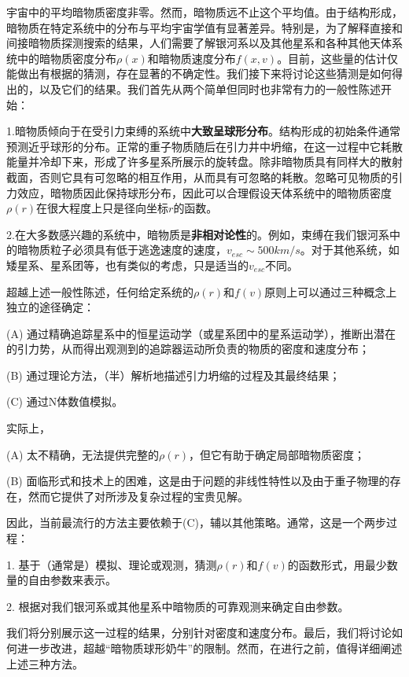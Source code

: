 


宇宙中的平均暗物质密度非零。然而，暗物质远不止这个平均值。由于结构形成，暗物质在特定系统中的分布与平均宇宙学值有显著差异。特别是，为了解释直接和间接暗物质探测搜索的结果，人们需要了解银河系以及其他星系和各种其他天体系统中的暗物质密度分布$\rho (x)$和暗物质速度分布$f(x, v)$。目前，这些量的估计仅能做出有根据的猜测，存在显著的不确定性。我们接下来将讨论这些猜测是如何得出的，以及它们的结果。我们首先从两个简单但同时也非常有力的一般性陈述开始：

1.暗物质倾向于在受引力束缚的系统中\textbf{大致呈球形分布}。结构形成的初始条件通常预测近乎球形的分布。正常的重子物质随后在引力井中坍缩，在这一过程中它耗散能量并冷却下来，形成了许多星系所展示的旋转盘。除非暗物质具有同样大的散射截面，否则它具有可忽略的相互作用，从而具有可忽略的耗散。忽略可见物质的引力效应，暗物质因此保持球形分布，因此可以合理假设天体系统中的暗物质密度$\rho(r)$在很大程度上只是径向坐标$r$的函数。

2.在大多数感兴趣的系统中，暗物质是\textbf{非相对论性}的。例如，束缚在我们银河系中的暗物质粒子必须具有低于逃逸速度的速度，$v_{esc} \sim 500 km/s$。对于其他系统，如矮星系、星系团等，也有类似的考虑，只是适当的$v_{esc}$不同。

超越上述一般性陈述，任何给定系统的$\rho(r)$和$f(v)$原则上可以通过三种概念上独立的途径确定：

(A) 通过精确追踪星系中的恒星运动学（或星系团中的星系运动学），推断出潜在的引力势，从而得出观测到的追踪器运动所负责的物质的密度和速度分布；

(B) 通过理论方法，（半）解析地描述引力坍缩的过程及其最终结果；

(C) 通过N体数值模拟。

实际上，

(A) 太不精确，无法提供完整的$\rho(r)$，但它有助于确定局部暗物质密度；

(B) 面临形式和技术上的困难，这是由于问题的非线性特性以及由于重子物理的存在，然而它提供了对所涉及复杂过程的宝贵见解。

因此，当前最流行的方法主要依赖于(C)，辅以其他策略。通常，这是一个两步过程：

1. 基于（通常是）模拟、理论或观测，猜测$\rho(r)$和$f(v)$的函数形式，用最少数量的自由参数来表示。

2. 根据对我们银河系或其他星系中暗物质的可靠观测来确定自由参数。

我们将分别展示这一过程的结果，分别针对密度和速度分布。最后，我们将讨论如何进一步改进，超越“暗物质球形奶牛”的限制。然而，在进行之前，值得详细阐述上述三种方法。


